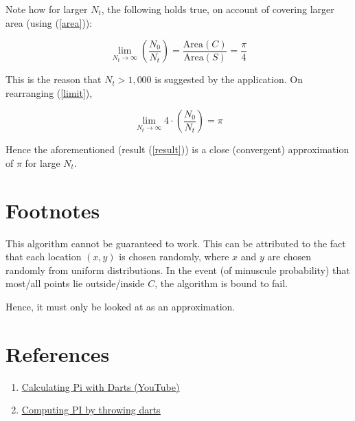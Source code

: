 \documentclass{article}
\newcommand{\bluelink}[2]{{\color{blue}\underline{\href{#1}{#2}}}}
\begin{document}
Note how for larger $N_t$, the following holds true, on account of covering larger area (using (\ref{area})):

\begin{equation}
    \label{limit}
    \lim_{N_t \to \infty} \left( \frac{N_0}{N_t} \right) = \frac{\text{Area}(C)}{\text{Area}(S)} = \frac{\pi}{4}
\end{equation}

This is the reason that $N_t > 1,000$ is suggested by the application. On rearranging (\ref{limit}),

\begin{equation}
    \label{result}
    \lim_{N_t \to \infty} 4 \cdot \left( \frac{N_0}{N_t} \right) = \pi
\end{equation}

Hence the aforementioned (result (\ref{result}))  is a close (convergent) approximation of $\pi$ for large $N_t$.

\section*{Footnotes}
This algorithm cannot be guaranteed to work. This can be attributed to the fact that each location $(x,y)$ is
chosen randomly, where $x$ and $y$ are chosen randomly from uniform distributions. In the event (of minuscule
probability) that most/all points lie outside/inside $C$, the algorithm is bound to fail.

\noindent Hence, it must only be looked at as an approximation.

\section*{References}
\begin{enumerate}
    \item \bluelink{https://www.youtube.com/watch?v=M34TO71SKGk}{Calculating Pi with Darts (YouTube)}
    \item \bluelink{https://www.cs.wustl.edu/~cytron/cs101/Lectures/5.html}{Computing PI by throwing darts}
\end{enumerate}
\end{document}
